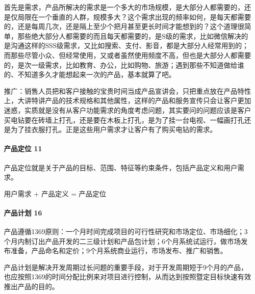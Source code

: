 \documentclass[letterpaper,11pt,english]{sphinxmanual}
\begin{document}
首先是需求，产品所解决的需求是一个多大的市场规模，是大部分人都需要的，还是仅局限在一个垂直的人群，规模多大？这个需求出现的频率如何，是每天都需要的，还是每周几次，还是隔上至少个把月甚至更长时间才能想到的？这个道理很简单，那些绝大部分人都需要的而且每天都需要的，是S级的需求，比如微信解决的是沟通这样的SSS级需求，又比如搜索、支付、影音，都是大部分人经常用到的；而那些尽管小众、但经常使用，又或者虽然使用频度不高，但也是大部分人都需要的，是次一级需求，比如教育、办公，比如购物、旅游；遇到那些不知道做给谁的、不知道多久才能想起来一次的产品，基本就算了吧。

推广：销售人员把和客户接触的宝贵时间当成产品宣讲会，只把重点放在产品特性上，大讲特讲产品的技术规格和其他属性，这样的产品和服务宣传只会让客户更加迷惑，实质就是没有从客户功能需求的角度考虑问题，其实要问的问题应该是客户买电钻要在砖墙上打孔，还是要在木板上打孔，是为了挂一台电视、一幅画打孔还是为了挂衣服打孔。正是这些用户需求才让客户有了购买电钻的需求。


\paragraph{产品定位 11\sphinxfootnotemark[30]}
\label{\detokenize{chapter_introduction/Product:id47}}%
\begin{footnotetext}[30]\sphinxAtStartFootnote
{}
%
\end{footnotetext}\ignorespaces 
产品定位就是关于产品的目标、范围、特征等约束条件，包括产品定义和用户需求。

用户需求 + 产品定义 = 产品定位


\paragraph{产品计划 16\sphinxfootnotemark[31]}
\label{\detokenize{chapter_introduction/Product:id48}}%
\begin{footnotetext}[31]\sphinxAtStartFootnote
{}
%
\end{footnotetext}\ignorespaces 
产品遵循1\sphinxhyphen{}3\sphinxhyphen{}6\sphinxhyphen{}9原则：一个月时间完成项目的可行性研究和市场定位、市场细化；3个月内制订出产品开发的二三级计划和产品包计划；6个月系统试运行，做市场发布准备，产品命名和定价；9个月系统商业运行，市场发布、推广和销售。

产品计划是解决开发周期过长问题的重要手段，对于开发周期短于9个月的产品，也应按照1\sphinxhyphen{}3\sphinxhyphen{}6\sphinxhyphen{}9的时间分配比例来对项目进行控制，从而达到按照暨定目标快速有效推出产品的目的。
\end{document}
